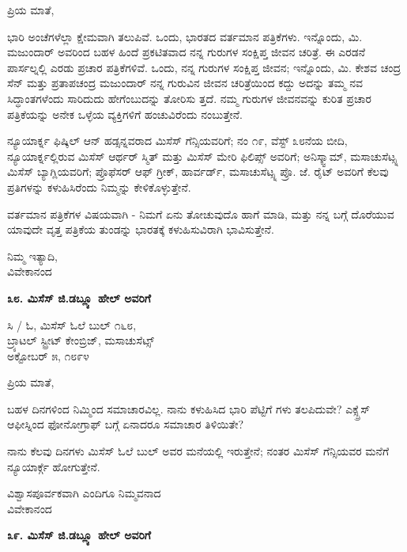 ಪ್ರಿಯ ಮಾತೆ,

ಭಾರಿ ಅಂಚೆಗಳೆಲ್ಲಾ ಕ್ಷೇಮವಾಗಿ ತಲುಪಿವೆ. ಒಂದು, ಭಾರತದ ವರ್ತಮಾನ ಪತ್ರಿಕೆಗಳು. ಇನ್ನೊಂದು, ಮಿ. ಮಜುಂದಾರ್ ಅವರಿಂದ ಬಹಳ ಹಿಂದೆ ಪ್ರಕಟಿತವಾದ ನನ್ನ ಗುರುಗಳ ಸಂಕ್ಷಿಪ್ತ ಜೀವನ ಚರಿತ್ರೆ. ಈ ಎರಡನೆ ಪಾರ್ಸಲ್ನಲ್ಲಿ ಎರಡು ಪ್ರಚಾರ ಪತ್ರಿಕೆಗಳಿವೆ. ಒಂದು, ನನ್ನ ಗುರುಗಳ ಸಂಕ್ಷಿಪ್ತ ಜೀವನ; ಇನ್ನೊಂದು, ಮಿ. ಕೇಶವ ಚಂದ್ರ ಸೆನ್ ಮತ್ತು ಪ್ರತಾಪಚಂದ್ರ ಮಜುಂದಾರ್ ನನ್ನ ಗುರುವಿನ ಜೀವನ ಚರಿತ್ರೆಯಿಂದ ಕದ್ದು ಅದನ್ನು ತಮ್ಮ ನವ ಸಿದ್ಧಾಂತಗಳೆಂದು ಸಾರಿದುದು ಹೇಗೆಂಬುದನ್ನು ತೋರಿಸು ತ್ತದೆ. ನಮ್ಮ ಗುರುಗಳ ಜೀವನವನ್ನು ಕುರಿತ ಪ್ರಚಾರ ಪತ್ರಿಕೆಯನ್ನು ಅನೇಕ ಒಳ್ಳೆಯ ವ್ಯಕ್ತಿಗಳಿಗೆ ಹಂಚುವಿರೆಂದು ನಂಬುತ್ತೇನೆ.

ನ್ಯೂಯಾರ್ಕ್ನ ಫಿಷ್ಕಿಲ್ ಆನ್ ಹಡ್ಸನ್ನವರಾದ ಮಿಸೆಸ್ ಗೆನ್ಸಿಯವರಿಗೆ; ನಂ ೧೯, ವೆಸ್ಟ್ ೩೮ನೆಯ ಬೀದಿ, ನ್ಯೂಯಾರ್ಕ್ನಲ್ಲಿರುವ ಮಿಸೆಸ್ ಆರ್ಥರ್ ಸ್ಮಿತ್ ಮತ್ತು ಮಿಸೆಸ್ ಮೇರಿ ಫಿಲಿಪ್ಸ್ ಅವರಿಗೆ; ಅನಿಸ್ಕ್ವಾಮ್​, ಮಸಾಚುಸೆಟ್ಸ್ನ ಮಿಸೆಸ್ ಬ್ಯಾಗ್ಲಿಯವರಿಗೆ; ಪ್ರೊಫೆಸರ್ ಆಫ್ ಗ್ರೀಕ್, ಹಾರ್ವರ್ಡ್, ಮಸಾಚುಸೆಟ್ಸ್ನ ಪ್ರೊ. ಜೆ. ರೈಟ್ ಅವರಿಗೆ ಕೆಲವು ಪ್ರತಿಗಳನ್ನು ಕಳುಹಿಸಿರೆಂದು ನಿಮ್ಮನ್ನು ಕೇಳಿಕೊಳ್ಳುತ್ತೇನೆ.

ವರ್ತಮಾನ ಪತ್ರಿಕೆಗಳ ವಿಷಯವಾಗಿ - ನಿಮಗೆ ಏನು ತೋಚುವುದೊ ಹಾಗೆ ಮಾಡಿ, ಮತ್ತು ನನ್ನ ಬಗ್ಗೆ ದೊರೆಯುವ ಯಾವುದೇ ವೃತ್ತ ಪತ್ರಿಕೆಯ ತುಂಡನ್ನು ಭಾರತಕ್ಕೆ ಕಳುಹಿಸುವಿರಾಗಿ ಭಾವಿಸುತ್ತೇನೆ.

\begin{flushright}
ನಿಮ್ಮ ಇತ್ಯಾದಿ,\\ವಿವೇಕಾನಂದ
\end{flushright}

\begin{center}
\textbf{೩೮. ಮಿಸೆಸ್ ಜಿ.ಡಬ್ಲ್ಯೂ ಹೇಲ್ ಅವರಿಗೆ}
\end{center}

\begin{flushright}
ಸಿ / ಓ, ಮಿಸೆಸ್ ಓಲೆ ಬುಲ್ ೧೬೮,\\ಬ್ರ್ಯಾಟಲ್ ಸ್ಟ್ರೀಟ್ ಕೇಂಬ್ರಿಜ್, ಮಸಾಚುಸೆಟ್ಸ್\\ಅಕ್ಟೋಬರ್ ೫, ೧೮೯೪
\end{flushright}

ಪ್ರಿಯ ಮಾತೆ,

ಬಹಳ ದಿನಗಳಿಂದ ನಿಮ್ಮಿಂದ ಸಮಾಚಾರವಿಲ್ಲ. ನಾನು ಕಳುಹಿಸಿದ ಭಾರಿ ಪೆಟ್ಟಿಗೆ ಗಳು ತಲಪಿದುವೇ? ಎಕ್ಸ್ಪ್ರೆಸ್ ಆಫೀಸ್ನಿಂದ ಫೋನೋಗ್ರಾಫ್ ಬಗ್ಗೆ ಏನಾದರೂ ಸಮಾಚಾರ ತಿಳಿಯಿತೇ?

ನಾನು ಕೆಲವು ದಿನಗಳು ಮಿಸೆಸ್ ಓಲೆ ಬುಲ್ ಅವರ ಮನೆಯಲ್ಲಿ ಇರುತ್ತೇನೆ; ನಂತರ ಮಿಸೆಸ್ ಗೆನ್ಸಿಯವರ ಮನೆಗೆ ನ್ಯೂಯಾರ್ಕ್ಗೆ ಹೋಗುತ್ತೇನೆ.

\begin{flushright}
ವಿಶ್ವಾಸಪೂರ್ವಕವಾಗಿ ಎಂದಿಗೂ ನಿಮ್ಮವನಾದ\\ವಿವೇಕಾನಂದ
\end{flushright}

\begin{center}
\textbf{೩೯. ಮಿಸೆಸ್ ಜಿ.ಡಬ್ಲ್ಯೂ ಹೇಲ್ ಅವರಿಗೆ}
\end{center}

